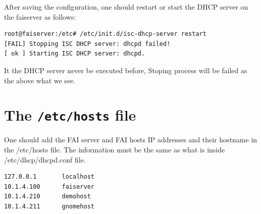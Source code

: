\documentclass[11pt
  , a4paper
  , article
  , oneside
]{memoir}
\begin{document}
After saving the configuration, one should restart or start the DHCP server on the faiserver as follows:     
\begin{lstlisting}
root@faiserver:/etc# /etc/init.d/isc-dhcp-server restart
[FAIL] Stopping ISC DHCP server: dhcpd failed!
[ ok ] Starting ISC DHCP server: dhcpd.
\end{lstlisting}
It the DHCP server never be executed before, Stoping process will be failed as the above what we see. 


\section{The \texttt{/etc/hosts} file} 

One should add the FAI server and FAI hosts IP addresses and their hostname in the /etc/hosts file. The information must be the same as what is inside /etc/dhcp/dhcpd.conf file. 
\begin{lstlisting}
127.0.0.1       localhost
10.1.4.100      faiserver
10.1.4.210      demohost
10.1.4.211      gnomehost

\end{lstlisting}


\clearpage
\end{document}
